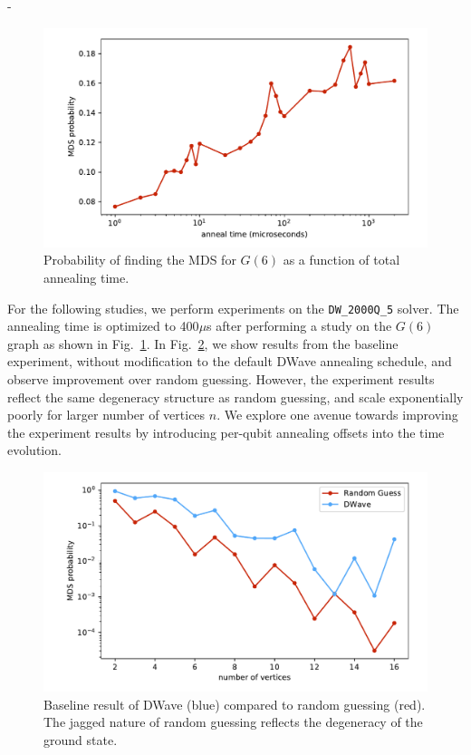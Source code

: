 -\documentclass[prd,twocolumn,tightenlines,preprintnumbers,showpacs,superscriptaddress,notitlepage,nofootinbib,eqsecnum,floatfix,longbibliography]{revtex4}
\begin{document}
\begin{figure}[b]
    \centering
    \includegraphics[width=\columnwidth]{./figures/anneal_time_scaling.pdf}
    \caption{Probability of finding the MDS for $G(6)$ as a function of total annealing time.}
    \label{fig:at_scale}
\end{figure}

For the following studies, we perform experiments on the \texttt{DW\_2000Q\_5} solver.
The annealing time is optimized to 400$\mu$s after performing a study on the $G(6)$ graph as shown in Fig.~\ref{fig:at_scale}.
In Fig.~\ref{fig:baseline}, we show results from the baseline experiment, without modification to the default DWave annealing schedule, and observe improvement over random guessing.
However, the experiment results reflect the same degeneracy structure as random guessing, and scale exponentially poorly for larger number of vertices $n$.
We explore one avenue towards improving the experiment results by introducing per-qubit annealing offsets into the time evolution.

\begin{figure}
    \centering
    \includegraphics[width=\columnwidth]{./figures/scaling_baseline.pdf}
    \caption{Baseline result of DWave (blue) compared to random guessing (red).
The jagged nature of random guessing reflects the degeneracy of the ground state.}
    \label{fig:baseline}
\end{figure}
\end{document}
